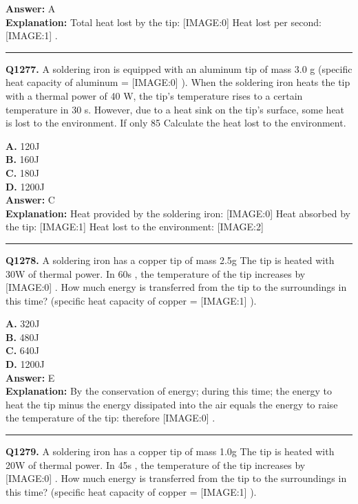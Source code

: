 \documentclass[12pt]{article}
\begin{document}
\textbf{Answer:} A \\
\textbf{Explanation:} Total heat lost by the tip:
[IMAGE:0]
Heat lost per second:
[IMAGE:1]
.

\hrule
\vspace{1em}


\noindent
\textbf{Q1277.} A soldering iron is equipped with an aluminum tip of mass 3.0 g (specific heat capacity of aluminum =
[IMAGE:0]
). When the soldering iron heats the tip with a thermal power of 40 W, the tip's temperature rises to a certain temperature in 30 s. However, due to a heat sink on the tip's surface, some heat is lost to the environment. If only 85%
Calculate the heat lost to the environment.



\textbf{A.} 120J \\
\textbf{B.} 160J \\
\textbf{C.} 180J \\
\textbf{D.} 1200J \\

\textbf{Answer:} C \\
\textbf{Explanation:} Heat provided by the soldering iron:
[IMAGE:0]
Heat absorbed by the tip:
[IMAGE:1]
Heat lost to the environment:
[IMAGE:2]

\hrule
\vspace{1em}


\noindent
\textbf{Q1278.} A soldering iron has a copper tip of mass 2.5g
The tip is heated with 30W
of thermal power. In 60s
, the temperature of the tip increases by
[IMAGE:0]
.
How much energy is transferred from the tip to the surroundings in this time? (specific heat capacity of copper =
[IMAGE:1]
).



\textbf{A.} 320J \\
\textbf{B.} 480J \\
\textbf{C.} 640J \\
\textbf{D.} 1200J \\

\textbf{Answer:} E \\
\textbf{Explanation:} By the conservation of energy; during this time; the energy to heat the tip minus the energy dissipated into the air equals the energy to raise the temperature of the tip: therefore
[IMAGE:0]
.

\hrule
\vspace{1em}


\noindent
\textbf{Q1279.} A soldering iron has a copper tip of mass 1.0g
The tip is heated with 20W
of thermal power. In 45s
, the temperature of the tip increases by
[IMAGE:0]
.
How much energy is transferred from the tip to the surroundings in this time? (specific heat capacity of copper =
[IMAGE:1]
).
\end{document}
